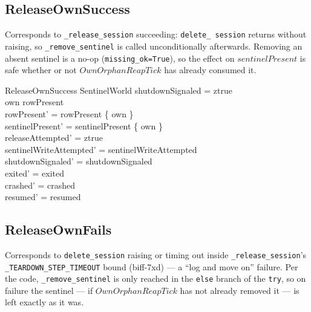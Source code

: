 \documentclass[a4paper,10pt,fleqn]{article}
\begin{document}
\subsection{ReleaseOwnSuccess}

Corresponds to \texttt{\_release\_session} succeeding: \texttt{delete\_
session} returns without raising, so \texttt{\_remove\_sentinel} is
called unconditionally afterwards.  Removing an absent sentinel is a
no-op (\texttt{missing\_ok=True}), so the effect on $sentinelPresent$
is safe whether or not $OwnOrphanReapTick$ has already consumed it.

\begin{schema}{ReleaseOwnSuccess}
  \Delta SentinelWorld
  \where
  shutdownSignaled = ztrue \\
  own \in rowPresent \\
  rowPresent' = rowPresent \setminus \{ own \} \\
  sentinelPresent' = sentinelPresent \setminus \{ own \} \\
  releaseAttempted' = ztrue \\
  sentinelWriteAttempted' = sentinelWriteAttempted \\
  shutdownSignaled' = shutdownSignaled \\
  exited' = exited \\
  crashed' = crashed \\
  resumed' = resumed
\end{schema}

\subsection{ReleaseOwnFails}

Corresponds to \texttt{delete\_session} raising or timing out inside
\texttt{\_release\_session}'s \texttt{\_TEARDOWN\_STEP\_TIMEOUT} bound
(biff-7xd) --- a ``log and move on'' failure.  Per the code,
\texttt{\_remove\_sentinel} is only reached in the \texttt{else} branch
of the \texttt{try}, so on failure the sentinel --- if $OwnOrphanReapTick$
has not already removed it --- is left exactly as it was.
\end{document}
